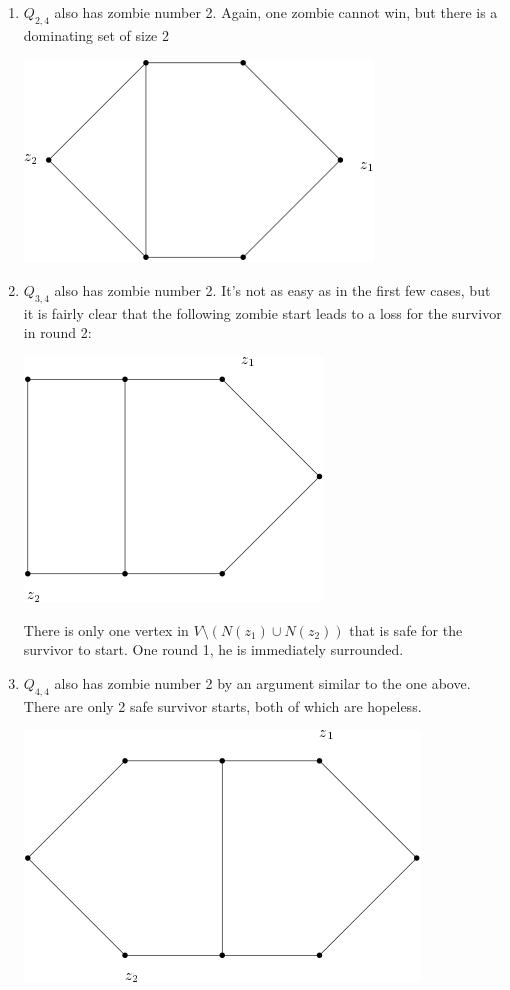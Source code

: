 \documentclass[letterpaper, 10pt]{article}
\begin{document}
\begin{enumerate}
\item $Q_{2,4}$ also has zombie number 2. Again, one zombie cannot win, but there is a dominating set of size 2

\begin{center}
  \includegraphics[scale=0.35]{Q_2,4}
\end{center}

\item $Q_{3,4}$ also has zombie number 2. It's not as easy as in the first few cases, but it is
fairly clear that the following zombie start leads to a loss for the survivor in round 2:

\begin{center}
  \includegraphics[scale=0.35]{Q_3,4}
\end{center}

There is only one vertex in $ V \setminus \left( N(z_1) \cup N(z_2) \right)$ that is
safe for the survivor to start. One round 1, he is immediately surrounded.

\item $Q_{4,4}$ also has zombie number 2 by an argument similar to the one above.
There are only 2 safe survivor starts, both of which are hopeless.

\begin{center}
  \includegraphics[scale=0.35]{Q_4,4}
\end{center}


\end{enumerate}
\end{document}
